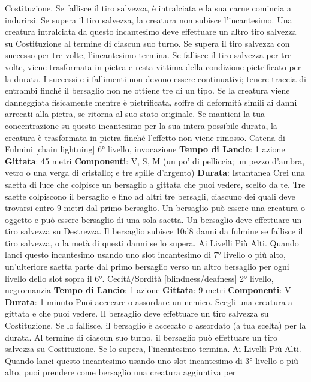 \begin{multicols}{2}
Costituzione. Se fallisce il tiro salvezza, è intralciata e la
sua carne comincia a indurirsi. Se supera il tiro
salvezza, la creatura non subisce l’incantesimo.
Una creatura intralciata da questo incantesimo deve
effettuare un altro tiro salvezza su Costituzione al
termine di ciascun suo turno. Se supera il tiro salvezza
con successo per tre volte, l’incantesimo termina. Se
fallisce il tiro salvezza per tre volte, viene trasformata in
pietra e resta vittima della condizione pietrificato per la
durata. I successi e i fallimenti non devono essere
continuativi; tenere traccia di entrambi finché il
bersaglio non ne ottiene tre di un tipo.
Se la creatura viene danneggiata fisicamente mentre è
pietrificata, soffre di deformità simili ai danni arrecati
alla pietra, se ritorna al suo stato originale.
Se mantieni la tua concentrazione su questo
incantesimo per la sua intera possibile durata, la
creatura è trasformata in pietra finché l’effetto non viene
rimosso.
Catena di Fulmini
[chain lightning]
6° livello, invocazione
\textbf{Tempo di Lancio}: 1 azione
\textbf{Gittata}: 45 metri
\textbf{Componenti}: V, S, M (un po’ di pelliccia; un pezzo
d’ambra, vetro o una verga di cristallo; e tre spille
d’argento)
\textbf{Durata}: Istantanea
Crei una saetta di luce che colpisce un bersaglio a
gittata che puoi vedere, scelto da te. Tre saette
colpiscono il bersaglio e fino ad altri tre bersagli,
ciascuno dei quali deve trovarsi entro 9 metri dal primo
bersaglio. Un bersaglio può essere una creatura o
oggetto e può essere bersaglio di una sola saetta.
Un bersaglio deve effettuare un tiro salvezza su
Destrezza. Il bersaglio subisce 10d8 danni da fulmine
se fallisce il tiro salvezza, o la metà di questi danni se lo
supera.
Ai Livelli Più Alti. Quando lanci questo incantesimo
usando uno slot incantesimo di 7° livello o più alto,
un’ulteriore saetta parte dal primo bersaglio verso un
altro bersaglio per ogni livello dello slot sopra il 6°.
Cecità/Sordità
[blindness/deafness]
2° livello, negromanzia
\textbf{Tempo di Lancio}: 1 azione
\textbf{Gittata}: 9 metri
\textbf{Componenti}: V
\textbf{Durata}: 1 minuto
Puoi accecare o assordare un nemico. Scegli una
creatura a gittata e che puoi vedere. Il bersaglio deve
effettuare un tiro salvezza su Costituzione. Se lo
fallisce, il bersaglio è accecato o assordato (a tua
scelta) per la durata. Al termine di ciascun suo turno, il
bersaglio può effettuare un tiro salvezza su
Costituzione. Se lo supera, l’incantesimo termina.
Ai Livelli Più Alti. Quando lanci questo incantesimo
usando uno slot incantesimo di 3° livello o più alto, puoi
prendere come bersaglio una creatura aggiuntiva per

\end{multicols}
